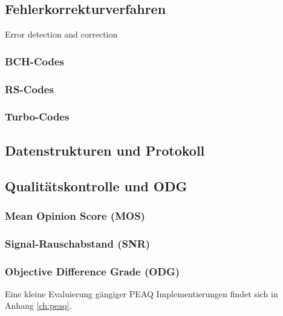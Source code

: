\subsection{Fehlerkorrekturverfahren}
\label{sec:errorcorrection}

Error detection and correction

\subsubsection{BCH-Codes}

\cite{chang2012location} \cite{huang2002blind}

\subsubsection{RS-Codes}

\subsubsection{Turbo-Codes}

\subsection{Datenstrukturen und Protokoll}
\label{sec:protokoll}

\subsection{Qualitätskontrolle und ODG }
\label{sec:qualitaetskontrolle}

\subsubsection{Mean Opinion Score (MOS)}

\cite{??}

\subsubsection{Signal-Rauschabstand (SNR)} 

\subsubsection{Objective Difference Grade (ODG)} 

Eine kleine Evaluierung gängiger PEAQ Implementierungen findet sich in Anhang \ref{ch:peaq}.


